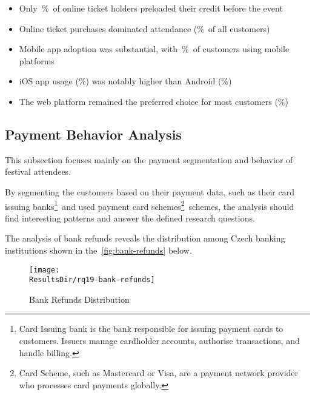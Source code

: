 \begin{keytakeaways}
	\begin{itemize}
		\item Only~\%~of online ticket holders preloaded their credit before the event
		\item Online ticket purchases dominated attendance (\%~of all customers)
		\item Mobile app adoption was substantial, with~\%~of customers using mobile platforms
		\item iOS app usage (\%) was notably higher than Android (\%)
		\item The web platform remained the preferred choice for most customers (\%)
	\end{itemize}
\end{keytakeaways}



\subsection{Payment Behavior Analysis}
\label{subsec:analysis-customer-payment-behavior}
This subsection focuses mainly on the payment segmentation and behavior of festival attendees.

By segmenting the customers based on their payment data,
such as their card issuing banks\footnote{Card Issuing bank is the bank responsible for issuing payment cards to customers. Issuers manage cardholder accounts, authorise transactions, and handle billing\cite{tl_what_are_card_schemes_and_how_do_they_work}.}~and
used payment card schemes\footnote{Card Scheme, such as Mastercard or Visa, are a payment network provider who processes card payments globally\cite{tl_what_are_card_schemes_and_how_do_they_work}.}~schemes,
the analysis should find interesting patterns and answer the defined research questions.


The analysis of bank refunds reveals the distribution among Czech banking institutions shown in the~\autoref{fig:bank-refunds} below.

\begin{figure}[H]
	\centering
	\texttt{[image: \\ResultsDir/rq19-bank-refunds]}
	\caption{Bank Refunds Distribution}
	\label{fig:bank-refunds}
	\source
\end{figure}


